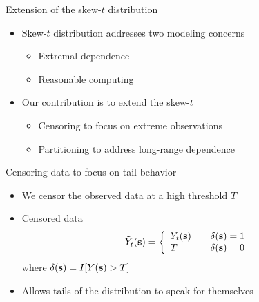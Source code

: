 \documentclass{beamer}
\begin{document}
\begin{frame}{Extension of the skew-$t$ distribution}
  \begin{itemize} \setlength{\itemsep}{1em}
    \item Skew-$t$ distribution addresses two modeling concerns \vspace{0.5em}
    \begin{itemize} \setlength{\itemsep}{0.5em}
      \item Extremal dependence
      \item Reasonable computing
    \end{itemize}
    \item Our contribution is to extend the skew-$t$ \vspace{0.5em}
    \begin{itemize} \setlength{\itemsep}{0.5em}
      \item Censoring to focus on extreme observations
      \item Partitioning to address long-range dependence
    \end{itemize}
  \end{itemize}
\end{frame}

\begin{frame}{Censoring data to focus on tail behavior}
  \begin{itemize} \setlength{\itemsep}{1em}
    \item We censor the observed data at a high threshold $T$
    \item Censored data
    \begin{align*}
      \tilde{Y}_t(\mbox{\bf s}) = \left\{ \begin{array}{ll}
          Y_t(\mbox{\bf s}) \quad & \delta(\mbox{\bf s}) = 1\\
          T \quad & \delta(\mbox{\bf s}) = 0
      \end{array}\right.
    \end{align*}
    where $\delta(\mbox{\bf s}) = I[Y(\mbox{\bf s}) > T]$
    \item Allows tails of the distribution to speak for themselves
  \end{itemize}
\end{frame}
\end{document}
